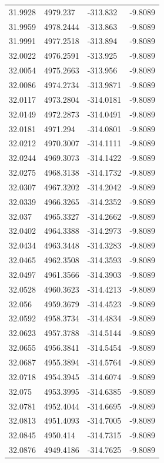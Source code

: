 \begin{table}[H]
\begin{tabular}{llll}
31.9928 & 4979.237 & -313.832 & -9.8089 \\
31.9959 & 4978.2444 & -313.863 & -9.8089 \\
31.9991 & 4977.2518 & -313.894 & -9.8089 \\
32.0022 & 4976.2591 & -313.925 & -9.8089 \\
32.0054 & 4975.2663 & -313.956 & -9.8089 \\
32.0086 & 4974.2734 & -313.9871 & -9.8089 \\
32.0117 & 4973.2804 & -314.0181 & -9.8089 \\
32.0149 & 4972.2873 & -314.0491 & -9.8089 \\
32.0181 & 4971.294 & -314.0801 & -9.8089 \\
32.0212 & 4970.3007 & -314.1111 & -9.8089 \\
32.0244 & 4969.3073 & -314.1422 & -9.8089 \\
32.0275 & 4968.3138 & -314.1732 & -9.8089 \\
32.0307 & 4967.3202 & -314.2042 & -9.8089 \\
32.0339 & 4966.3265 & -314.2352 & -9.8089 \\
32.037 & 4965.3327 & -314.2662 & -9.8089 \\
32.0402 & 4964.3388 & -314.2973 & -9.8089 \\
32.0434 & 4963.3448 & -314.3283 & -9.8089 \\
32.0465 & 4962.3508 & -314.3593 & -9.8089 \\
32.0497 & 4961.3566 & -314.3903 & -9.8089 \\
32.0528 & 4960.3623 & -314.4213 & -9.8089 \\
32.056 & 4959.3679 & -314.4523 & -9.8089 \\
32.0592 & 4958.3734 & -314.4834 & -9.8089 \\
32.0623 & 4957.3788 & -314.5144 & -9.8089 \\
32.0655 & 4956.3841 & -314.5454 & -9.8089 \\
32.0687 & 4955.3894 & -314.5764 & -9.8089 \\
32.0718 & 4954.3945 & -314.6074 & -9.8089 \\
32.075 & 4953.3995 & -314.6385 & -9.8089 \\
32.0781 & 4952.4044 & -314.6695 & -9.8089 \\
32.0813 & 4951.4093 & -314.7005 & -9.8089 \\
32.0845 & 4950.414 & -314.7315 & -9.8089 \\
32.0876 & 4949.4186 & -314.7625 & -9.8089 \\

\end{tabular}
\end{table}
